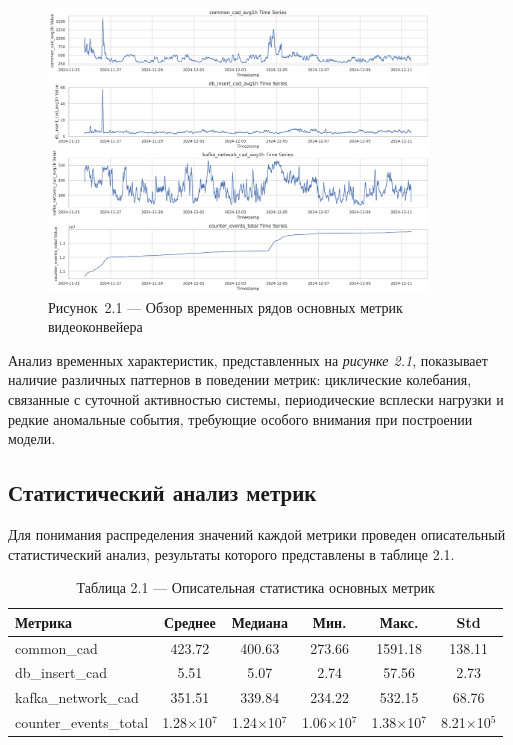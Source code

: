 \begin{figure}[H]
	\centering
	\includegraphics[width=0.9\textwidth]{figures/chapter2/time_series_overview.png}
	\caption*{Рисунок~2.1 --- Обзор временных рядов основных метрик видеоконвейера}
	\label{fig:time_series_overview}
\end{figure}

Анализ временных характеристик, представленных на \textit{рисунке 2.1}, показывает наличие различных паттернов в поведении метрик: циклические колебания, связанные с суточной активностью системы, периодические всплески нагрузки и редкие аномальные события, требующие особого внимания при построении модели.

\subsection{Статистический анализ метрик}

Для понимания распределения значений каждой метрики проведен описательный статистический анализ, результаты которого представлены в таблице 2.1.

\begin{table}[H]
	\centering
	\caption*{Таблица 2.1 --- Описательная статистика основных метрик}
	\begin{tabular}{|l|c|c|c|c|c|}
		\hline
		\textbf{Метрика} & \textbf{Среднее} & \textbf{Медиана} & \textbf{Мин.} & \textbf{Макс.} & \textbf{Std} \\
		\hline
		common\_cad & 423.72 & 400.63 & 273.66 & 1591.18 & 138.11 \\
		db\_insert\_cad & 5.51 & 5.07 & 2.74 & 57.56 & 2.73 \\
		kafka\_network\_cad & 351.51 & 339.84 & 234.22 & 532.15 & 68.76 \\
		counter\_events\_total & 1.28$\times$10$^{7}$ & 1.24$\times$10$^{7}$ & 1.06$\times$10$^{7}$ & 1.38$\times$10$^{7}$ & 8.21$\times$10$^{5}$ \\
		\hline
	\end{tabular}
	\label{tab:descriptive_stats}
\end{table}

